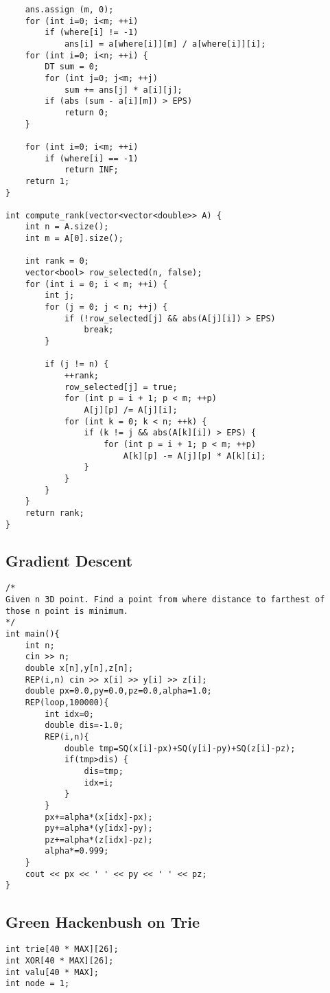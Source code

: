 \documentclass[10pt,a4paper,onesided]{article}
\begin{document}
\begin{multicols*}{3}
\begin{lstlisting}
    ans.assign (m, 0);
    for (int i=0; i<m; ++i)
        if (where[i] != -1)
            ans[i] = a[where[i]][m] / a[where[i]][i];
    for (int i=0; i<n; ++i) {
        DT sum = 0;
        for (int j=0; j<m; ++j)
            sum += ans[j] * a[i][j];
        if (abs (sum - a[i][m]) > EPS)
            return 0;
    }

    for (int i=0; i<m; ++i)
        if (where[i] == -1)
            return INF;
    return 1;
}

int compute_rank(vector<vector<double>> A) {
    int n = A.size();
    int m = A[0].size();

    int rank = 0;
    vector<bool> row_selected(n, false);
    for (int i = 0; i < m; ++i) {
        int j;
        for (j = 0; j < n; ++j) {
            if (!row_selected[j] && abs(A[j][i]) > EPS)
                break;
        }

        if (j != n) {
            ++rank;
            row_selected[j] = true;
            for (int p = i + 1; p < m; ++p)
                A[j][p] /= A[j][i];
            for (int k = 0; k < n; ++k) {
                if (k != j && abs(A[k][i]) > EPS) {
                    for (int p = i + 1; p < m; ++p)
                        A[k][p] -= A[j][p] * A[k][i];
                }
            }
        }
    }
    return rank;
}\end{lstlisting}
\subsection{Gradient Descent}
\begin{lstlisting}
/*
Given n 3D point. Find a point from where distance to farthest of those n point is minimum.
*/
int main(){
    int n;
    cin >> n;
    double x[n],y[n],z[n];
    REP(i,n) cin >> x[i] >> y[i] >> z[i];
    double px=0.0,py=0.0,pz=0.0,alpha=1.0;
    REP(loop,100000){
        int idx=0;
        double dis=-1.0;
        REP(i,n){
            double tmp=SQ(x[i]-px)+SQ(y[i]-py)+SQ(z[i]-pz);
            if(tmp>dis) {
                dis=tmp;
                idx=i;
            }
        }
        px+=alpha*(x[idx]-px);
        py+=alpha*(y[idx]-py);
        pz+=alpha*(z[idx]-pz);
        alpha*=0.999;
    }
    cout << px << ' ' << py << ' ' << pz;
}
\end{lstlisting}
\subsection{Green Hackenbush on Trie}
\begin{lstlisting}
int trie[40 * MAX][26];
int XOR[40 * MAX][26];
int valu[40 * MAX];
int node = 1;


\end{lstlisting}
\end{multicols*}
\end{document}
